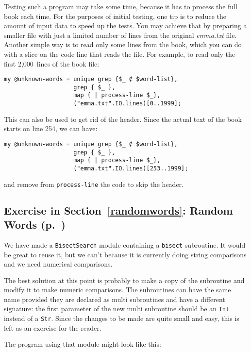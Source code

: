 Testing such a program may take some time, because it has to 
process the full book each time. For the purposes of initial 
testing, one tip is to reduce the amount of input 
data to speed up the tests. You may achieve that by 
preparing a smaller file with just a limited number 
of lines from the original \emph{emma.txt} file. 
Another simple way is to read only some lines from the 
book, which you can do with a slice on the code line that 
reads the file. For example, to read only the first 2,000~lines 
of the book file:

\begin{verbatim}
my @unknown-words = unique grep {$_ ∉ $word-list}, 
                    grep { $_ }, 
                    map { | process-line $_},  
                    ("emma.txt".IO.lines)[0..1999]; 
\end{verbatim}

This can also be used to get rid of the header. Since the 
actual text of the book starts on line 254, we can have:

\begin{verbatim}
my @unknown-words = unique grep {$_ ∉ $word-list}, 
                    grep { $_ }, 
                    map { | process-line $_},  
                    ("emma.txt".IO.lines)[253..1999]; 
\end{verbatim}
and remove from {\tt process-line} the code to skip the header.

\subsection{Exercise in Section~\ref{randomwords}: Random Words (p.~\pageref{randhist})}
\label{sol_randhist}

We have made a {\tt BisectSearch} module containing a {\tt bisect} 
subroutine. It would be great to reuse it, but we can't because 
it is currently doing string comparisons and we need numerical 
comparisons.
 
The best solution at this point is probably to make a copy of 
the subroutine and modify it 
to make numeric comparisons. The subroutines can have the same 
name provided they are declared as multi subroutines and have 
a different signature: the first parameter of the new multi 
subroutine should be an {\tt Int} instead of a {\tt Str}. Since 
the changes to be made are quite small and easy, this is 
left as an exercise for the reader.

The program using that module might look like this:

